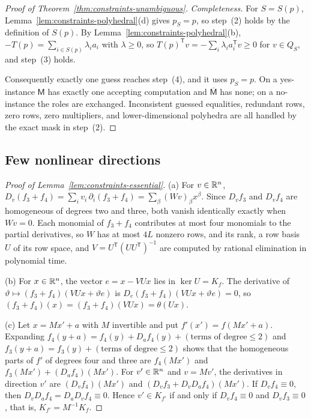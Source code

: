 \begin{proof}[Proof of Theorem~\ref{thm:constraints-unambiguous}]
\emph{Completeness.} For $S=S(p)$, Lemma~\ref{lem:constraints-polyhedral}(d)
gives $p_S=p$, so step~(2) holds by the definition of $S(p)$. By
Lemma~\ref{lem:constraints-polyhedral}(b), $-T(p)=\sum_{i\in S(p)}\lambda_ia_i$
with $\lambda\ge0$, so $T(p)^{\mathsf T}v=-\sum_i\lambda_ia_i^{\mathsf T}v\ge0$
for $v\in Q_S$, and step~(3) holds.

Consequently exactly one guess reaches step~(4), and it uses $p_S=p$. On a
yes-instance $\mathsf M$ has exactly one accepting computation and
$\overline{\mathsf M}$ has none; on a no-instance the roles are exchanged.
Inconsistent guessed equalities, redundant rows, zero rows, zero multipliers,
and lower-dimensional polyhedra are all handled by the exact mask in
step~(2).
\end{proof}


\subsection{Few nonlinear directions}
\label{app:constraints-nonlinear}

\begin{proof}[Proof of Lemma~\ref{lem:constraints-essential}]
(a) For $v\in\mathbb R^n$,
$D_v(f_3+f_4)=\sum_iv_i\,\partial_i(f_3+f_4)=\sum_\beta(Wv)_\beta x^\beta$.
Since $D_vf_3$ and $D_vf_4$ are homogeneous of degrees two and three, both
vanish identically exactly when $Wv=0$. Each monomial of $f_3+f_4$
contributes at most four monomials to the partial derivatives, so $W$ has at
most $4L$ nonzero rows, and its rank, a row basis $U$ of its row space, and
$V=U^{\mathsf T}(UU^{\mathsf T})^{-1}$ are computed by rational elimination
in polynomial time.

(b) For $x\in\mathbb R^n$, the vector $e=x-VUx$ lies in $\ker U=K_f$. The derivative
of $\vartheta\mapsto(f_3+f_4)(VUx+\vartheta e)$ is
$D_e(f_3+f_4)(VUx+\vartheta e)=0$, so $(f_3+f_4)(x)=(f_3+f_4)(VUx)=\theta(Ux)$.

(c) Let $x=Mx'+a$ with $M$ invertible and put $f'(x')=f(Mx'+a)$. Expanding
$f_4(y+a)=f_4(y)+D_af_4(y)+(\text{terms of degree}\le2)$ and
$f_3(y+a)=f_3(y)+(\text{terms of degree}\le2)$ shows that the homogeneous
parts of $f'$ of degrees four and three are $f_4(Mx')$ and
$f_3(Mx')+(D_af_4)(Mx')$. For $v'\in\mathbb R^n$ and $v=Mv'$, the derivatives in
direction $v'$ are $(D_vf_4)(Mx')$ and $(D_vf_3+D_vD_af_4)(Mx')$. If
$D_vf_4\equiv0$, then $D_vD_af_4=D_aD_vf_4\equiv0$. Hence $v'\in K_{f'}$ if and
only if $D_vf_4\equiv0$ and $D_vf_3\equiv0$, that is, $K_{f'}=M^{-1}K_f$.
\end{proof}

